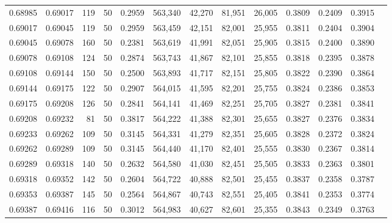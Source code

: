 \begin{tabular}{rrrrrrrrrrrrr}
0.68985 & 0.69017 &   119 &  50 &                                     0.2959 & 563,340 &  42,270 &  81,951 &  26,005 & 0.3809 & 0.2409 & 0.3915 \\
0.69017 & 0.69045 &   119 &  50 &                                     0.2959 & 563,459 &  42,151 &  82,001 &  25,955 & 0.3811 & 0.2404 & 0.3904 \\
0.69045 & 0.69078 &   160 &  50 &                                     0.2381 & 563,619 &  41,991 &  82,051 &  25,905 & 0.3815 & 0.2400 & 0.3890 \\
0.69078 & 0.69108 &   124 &  50 &                                     0.2874 & 563,743 &  41,867 &  82,101 &  25,855 & 0.3818 & 0.2395 & 0.3878 \\
0.69108 & 0.69144 &   150 &  50 &                                     0.2500 & 563,893 &  41,717 &  82,151 &  25,805 & 0.3822 & 0.2390 & 0.3864 \\
0.69144 & 0.69175 &   122 &  50 &                                     0.2907 & 564,015 &  41,595 &  82,201 &  25,755 & 0.3824 & 0.2386 & 0.3853 \\
0.69175 & 0.69208 &   126 &  50 &                                     0.2841 & 564,141 &  41,469 &  82,251 &  25,705 & 0.3827 & 0.2381 & 0.3841 \\
0.69208 & 0.69232 &    81 &  50 &                                     0.3817 & 564,222 &  41,388 &  82,301 &  25,655 & 0.3827 & 0.2376 & 0.3834 \\
0.69233 & 0.69262 &   109 &  50 &                                     0.3145 & 564,331 &  41,279 &  82,351 &  25,605 & 0.3828 & 0.2372 & 0.3824 \\
0.69262 & 0.69289 &   109 &  50 &                                     0.3145 & 564,440 &  41,170 &  82,401 &  25,555 & 0.3830 & 0.2367 & 0.3814 \\
0.69289 & 0.69318 &   140 &  50 &                                     0.2632 & 564,580 &  41,030 &  82,451 &  25,505 & 0.3833 & 0.2363 & 0.3801 \\
0.69318 & 0.69352 &   142 &  50 &                                     0.2604 & 564,722 &  40,888 &  82,501 &  25,455 & 0.3837 & 0.2358 & 0.3787 \\
0.69353 & 0.69387 &   145 &  50 &                                     0.2564 & 564,867 &  40,743 &  82,551 &  25,405 & 0.3841 & 0.2353 & 0.3774 \\
0.69387 & 0.69416 &   116 &  50 &                                     0.3012 & 564,983 &  40,627 &  82,601 &  25,355 & 0.3843 & 0.2349 & 0.3763 \\

\end{tabular}
